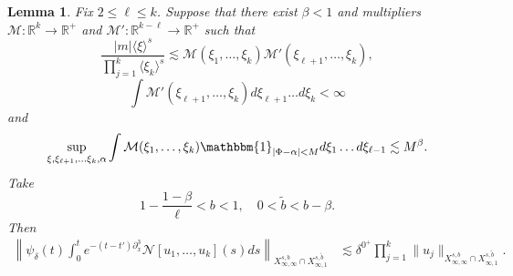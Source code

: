 \documentclass[%
11pt,  reqno]{amsart}
\newcommand{\jap}[1]{\langle #1 \rangle}
\newcommand{\5}{\textup{V}}
\newcommand{\les}{\lesssim}
\newcommand{\wt}{\widetilde}
\newtheorem{lemma}[theorem]{Lemma}
\theoremstyle{remark}
\newtheorem{remark}[theorem]{Remark}
\newcommand{\R}{\mathbb{R}}
\numberwithin{equation}{section}
\numberwithin{theorem}{section}
\newcommand{\Ncal}{\mathcal{N}}
\begin{document}
{		\begin{lemma}\label{lem:reduction_fre_kge3}
			Fix $2\le \ell\le k$. Suppose that there exist $\beta<1$ and multipliers $\mathcal{M}:\R^k\to \R^+$ and $\mathcal{M}':\R^{k-\ell}\to \R^+$ such that
			\begin{equation}
				\frac{|m|\jap{\xi}^s}{\prod_{j=1}^k\jap{\xi_k}^s} \lesssim \mathcal{M}(\xi_1,\dots, \xi_{k})\mathcal{M}'(\xi_{\ell+1},\dots, \xi_{{k}}),
			\end{equation}
			\begin{equation}
				\int \mathcal{M}'(\xi_{\ell+1},\dots, \xi_{{k}}) d\xi_{\ell+1}\dots d\xi_k <\infty
			\end{equation}
			and
			\begin{equation}\label{fre_kge3}
				\sup_{\xi, \xi_{\ell+1},\dots \xi_{k},\alpha} \int \mathcal{M}(\xi_1,\dots,\xi_k) \mathbbm{1}_{|\Phi-\alpha|<M} d\xi_1\dots d\xi_{\ell-1} \lesssim  M^\beta.
			\end{equation}
			Take
            $$
            1-\frac{1-\beta}{\ell}<b<1,\quad 0<\tilde{b}<b-\beta.
            $$
Then 
			\begin{align}
				\left\|\psi_\delta(t)\int_0^te^{-(t-t')\partial_x^3}\Ncal[u_1,\dots, u_k](s)ds \right\|_{X^{s,b}_{\infty, \infty}\cap X^{s,\tilde{b}}_{\infty, 1}} & \les \delta^{0^+}\prod_{j=1}^k\|u_j\|_{X^{s,b}_{\infty, \infty} \cap X^{s,\tilde{b}}_{\infty,1}}.
			\end{align}
			
		\end{lemma}
		
}
\end{document}
